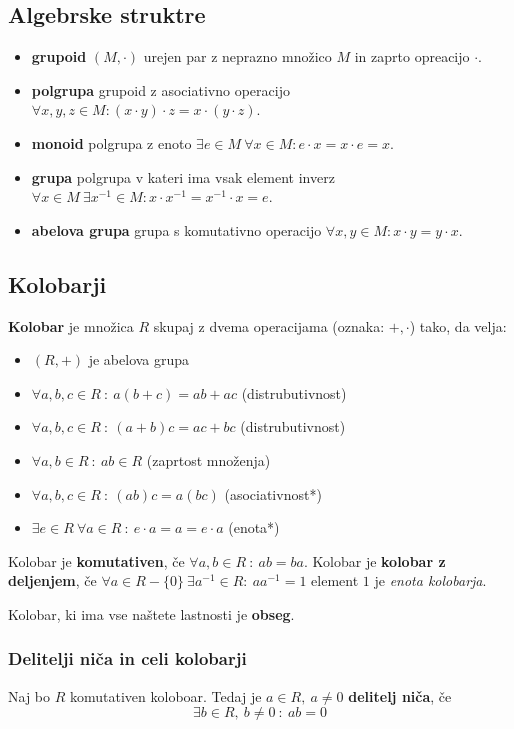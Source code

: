 
\subsection*{Algebrske struktre}
\begin{itemize}
	\item \textbf{grupoid} $(M, \cdot)$ urejen par z neprazno množico $M$ in zaprto opreacijo $\cdot$.
	\item \textbf{polgrupa} grupoid z asociativno operacijo $ \forall x,y,z \in M : (x\cdot y)\cdot z = x\cdot (y\cdot z)$.
	\item \textbf{monoid} polgrupa z enoto $ \exists e \in M \ \forall x \in M : e\cdot x = x\cdot e = x$.
	\item \textbf{grupa} polgrupa v kateri ima vsak element inverz $ \forall x \in M \ \exists x^{-1} \in M : x\cdot x^{-1} = x^{-1}\cdot x = e$.
	\item \textbf{abelova grupa} grupa s komutativno operacijo $ \forall x,y \in M  : x\cdot y = y\cdot x$.
\end{itemize} 

\subsection*{Kolobarji}
\textbf{Kolobar} je množica $R$ skupaj z dvema operacijama (oznaka: $+, \cdot$) tako, da velja:
\begin{itemize}
	\item $(R, +)$ je abelova grupa
	\item $\forall a, b, c \in R\ :\ a(b+c) = ab + ac$ (distrubutivnost)
	\item $\forall a, b, c \in R\ :\ (a+b)c = ac + bc$ (distrubutivnost)
	\item $\forall a, b \in R\ :\ ab \in R$ (zaprtost množenja)
	\item $\forall a, b, c \in R\ :\ (ab)c = a(bc)$ (asociativnost*)
	\item $\exists e \in R\ \forall a \in R\ :\ e\cdot a = a = e\cdot a$ (enota*)
\end{itemize}
Kolobar je \textbf{komutativen}, če $\forall a, b \in R\ :\ ab = ba$.
Kolobar je \textbf{kolobar z deljenjem}, če $\forall a \in R-\{0\}\ \exists a^{-1} \in R :\ aa^{-1} = 1$ element $1$ je \emph{enota kolobarja}.

Kolobar, ki ima vse naštete lastnosti je \textbf{obseg}.

\subsubsection*{Delitelji niča in celi kolobarji}
Naj bo $R$ komutativen koloboar. Tedaj je $a \in R,\ a \neq 0$ \textbf{delitelj niča}, če
\[ \exists b \in R,\ b \neq 0\ :\ ab = 0 \]

